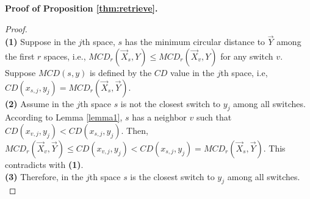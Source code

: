 \documentclass[10pt,conference]{IEEEtran}
\begin{document}
\begin{appendix}
\textbf{Proof of Proposition \ref{thm:retrieve}.}
\begin{proof} \hspace{20 mm}\\
\textbf{(1)} Suppose in the $j$th space, $s$ has the minimum circular distance to $\vec{Y}$ among the first $r$ spaces, i.e., $MCD_r(\vec{X}_s,Y) \leq MCD_r(\vec{X}_v,Y)$ for any switch $v$.  Suppose $MCD(s,y)$ is defined by the $CD$ value in the $j$th space, i.e, $CD(x_{s,j}, y_{j})= MCD_r(\vec{X}_s, \vec{Y})$.\\
\textbf{(2)} Assume in the $j$th space $s$ is not the closest switch to $y_j$ among all switches. According to Lemma \ref{lemma1}, $s$ has a neighbor $v$ such that $CD(x_{v, j}, y_j) < CD(x_{s,j}, y_{j})$. Then, $MCD_r(\vec{X}_v, \vec{Y}) \leq CD(x_{v, j}, y_j) < CD(x_{s,j}, y_{j})= MCD_r(\vec{X}_s, \vec{Y})$. This contradicts with \textbf{(1)}.\\
\textbf{(3)} Therefore, in the $j$th space $s$ is the closest switch to $y_j$ among all switches.\\
\end{proof}
\fi

\iffalse
\begin{codebox}
\Procname{$\proc{\textbf{Algorithm 1.} Deploy-as-a-whole construction}$}
\textbf{input:} Number of switches $N$, number of servers $H$,\\ \ \ \ \ \ \ \ \ \ number of ports of each switch $w$.\\
\textbf{output:}  S2 network topology\\
\li Uniformly assign hosts to switches
\li $ L \gets \lfloor \frac{1}{2} (w - \lceil \frac{H}{N} \rceil)\rfloor $
\li Generate random coordinates for all switches
\li \For $i \gets 1$ \To $L$
\li \Do In the $i$th space, each switch $s$ has coordinate $x_{is}$
\li \For each switch $s$
\li \ \ \ \ \ \For each adjacent switch $u$ of $s$ on the ring
\li \ \ \ \ \ \ \ \ \ \ \ \ \ \ \ \ \ \ \ \ \ \ \ \ \ \Do  \If $u$ and $s$ are not connected
\li \ \ \ \ \ \ \ \ \ \ \ \ \ \ \ \ \ \Then  mark to connect $u$ and $s$\End \End \End \End

\li \While there are two switches $u$ and $v$ with free ports
\li \Do mark a cable to connect $u$ and $v$
\End
\end{codebox}

\begin{codebox}
\Procname{$\proc{\textbf{Algorithm 2.} Incremental construction}$}
\textbf{input:} Current S2 topology, a new ToR switch $s$\\
\textbf{output:} Updated S2 network topology\\
\li Generate random coordinates for $s$
\li \For $i \gets 1$ \To $L$
\li \Do $s$ has coordinate $x_{is}$
\li  $u , v \gets$ two adjacent switches of $s$ in the $i$th space
\li  Remove the link between $u$ and $v$
\li  \textbf{if} $u$ and $s$ are not connected \textbf{then} connect $u$ and $s$
\li  \textbf{if} $v$ and $s$ are not connected \textbf{then} connect $v$ and $s$  \End
\li \While there are two switches $u$ and $v$ with free ports
\li \Do connect $u$ and $v$
\End
\end{codebox}
\fi


\end{appendix}
\end{document}
